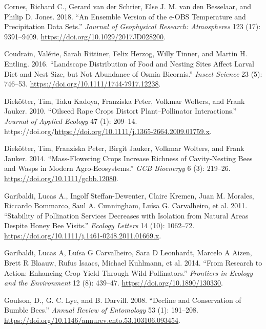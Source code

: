 \documentclass[smallextended]{svjour3}       %
\newlength{\cslhangindent}
\newenvironment{CSLReferences}[2] %
 {%
  \setlength{\parindent}{0pt}
  \ifodd #1 \everypar{\setlength{\hangindent}{\cslhangindent}}\ignorespaces\fi
  \ifnum #2 > 0
  \setlength{\parskip}{#2\baselineskip}
  \fi
 }%
 {}
\begin{document}
\begin{CSLReferences}{1}{0}
\leavevmode{}%
Cornes, Richard C., Gerard van der Schrier, Else J. M. van den
Besselaar, and Philip D. Jones. 2018. {``An Ensemble Version of the
e-OBS Temperature and Precipitation Data Sets.''} \emph{Journal of
Geophysical Research: Atmospheres} 123 (17): 9391--9409.
\url{https://doi.org/10.1029/2017JD028200}.

\leavevmode{}%
Coudrain, Valérie, Sarah Rittiner, Felix Herzog, Willy Tinner, and
Martin H. Entling. 2016. {``Landscape Distribution of Food and Nesting
Sites Affect Larval Diet and Nest Size, but Not Abundance of Osmia
Bicornis.''} \emph{Insect Science} 23 (5): 746--53.
\url{https://doi.org/10.1111/1744-7917.12238}.

\leavevmode{}%
Diekötter, Tim, Taku Kadoya, Franziska Peter, Volkmar Wolters, and Frank
Jauker. 2010. {``Oilseed Rape Crops Distort Plant--Pollinator
Interactions.''} \emph{Journal of Applied Ecology} 47 (1): 209--14.
https://doi.org/\url{https://doi.org/10.1111/j.1365-2664.2009.01759.x}.

\leavevmode{}%
Diekötter, Tim, Franziska Peter, Birgit Jauker, Volkmar Wolters, and
Frank Jauker. 2014. {``Mass-Flowering Crops Increase Richness of
Cavity-Nesting Bees and Wasps in Modern Agro-Ecosystems.''} \emph{GCB
Bioenergy} 6 (3): 219--26. \url{https://doi.org/10.1111/gcbb.12080}.

\leavevmode{}%
Garibaldi, Lucas A., Ingolf Steffan-Dewenter, Claire Kremen, Juan M.
Morales, Riccardo Bommarco, Saul A. Cunningham, Luísa G. Carvalheiro, et
al. 2011. {``Stability of Pollination Services Decreases with Isolation
from Natural Areas Despite Honey Bee Visits.''} \emph{Ecology Letters}
14 (10): 1062--72.
\url{https://doi.org/10.1111/j.1461-0248.2011.01669.x}.

\leavevmode{}%
Garibaldi, Lucas A, Luísa G Carvalheiro, Sara D Leonhardt, Marcelo A
Aizen, Brett R Blaauw, Rufus Isaacs, Michael Kuhlmann, et al. 2014.
{``From Research to Action: Enhancing Crop Yield Through Wild
Pollinators.''} \emph{Frontiers in Ecology and the Environment} 12 (8):
439--47. \url{https://doi.org/10.1890/130330}.

\leavevmode{}%
Goulson, D., G. C. Lye, and B. Darvill. 2008. {``Decline and
Conservation of Bumble Bees.''} \emph{Annual Review of Entomology} 53
(1): 191--208.
\url{https://doi.org/10.1146/annurev.ento.53.103106.093454}.


\end{CSLReferences}
\end{document}
